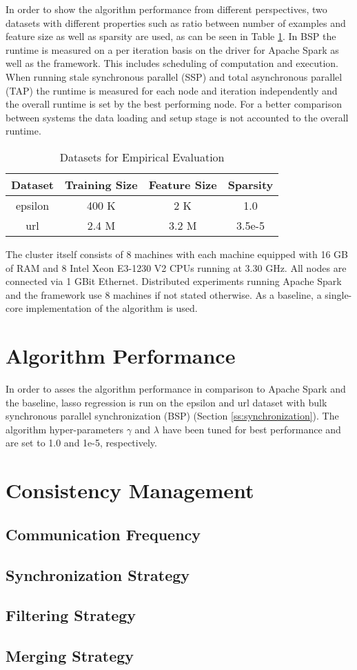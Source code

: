 In order to show the algorithm performance from different perspectives, two datasets with different properties such as ratio between number of examples and feature size as well as sparsity are used, as can be seen in Table \ref{tab:datasets}.
In BSP the runtime is measured on a per iteration basis on the driver for Apache Spark as well as the framework.
This includes scheduling of computation and execution.
When running stale synchronous parallel (SSP) and total asynchronous parallel (TAP) the runtime is measured for each node and iteration independently and the overall runtime is set by the best performing node.
For a better comparison between systems the data loading and setup stage is not accounted to the overall runtime.
\begin{table}[h]
\begin{center}
\begin{tabular}{ | c | c | c | c |}
\hline
\textbf{Dataset} & \textbf{Training Size} & \textbf{Feature Size} & \textbf{Sparsity} \\ \hline
epsilon & 400 K & 2 K & 1.0 \\ \hline
url & 2.4 M & 3.2 M & 3.5e-5 \\
\hline
\end{tabular}
\end{center}
\caption{Datasets for Empirical Evaluation}
\label{tab:datasets}
\end{table}

The cluster itself consists of 8 machines with each machine equipped with 16 GB of RAM and 8 Intel Xeon E3-1230 V2 CPUs running at 3.30 GHz.
All nodes are connected via 1 GBit Ethernet.
Distributed experiments running Apache Spark and the framework use 8 machines if not stated otherwise.
As a baseline, a single-core implementation of the algorithm is used.

\section{Algorithm Performance}
In order to asses the algorithm performance in comparison to Apache Spark and the baseline, lasso regression is run on the epsilon and url dataset with bulk synchronous parallel synchronization (BSP) (Section \ref{ss:synchronization}).
The algorithm hyper-parameters $\gamma$ and $\lambda$ have been tuned for best performance and are set to 1.0 and 1e-5, respectively.


\section{Consistency Management}


\subsection{Communication Frequency}

\subsection{Synchronization Strategy}

\subsection{Filtering Strategy}

\subsection{Merging Strategy}
